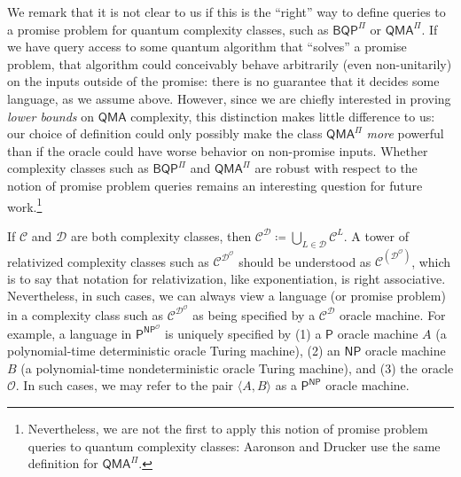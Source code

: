 \documentclass[10pt,a4paper]{article}
\begin{document}
We remark that it is not clear to us if this is the ``right'' way to define queries to a promise problem for quantum complexity classes, such as $\mathsf{BQP}^\Pi$ or $\mathsf{QMA}^\Pi$. If we have query access to some quantum algorithm that ``solves'' a promise problem, that algorithm could conceivably behave arbitrarily (even non-unitarily) on the inputs outside of the promise: there is no guarantee that it decides some language, as we assume above. However, since we are chiefly interested in proving \textit{lower bounds} on $\mathsf{QMA}$ complexity, this distinction makes little difference to us: our choice of definition could only possibly make the class $\mathsf{QMA}^\Pi$ \textit{more} powerful than if the oracle could have worse behavior on non-promise inputs. Whether complexity classes such as $\mathsf{BQP}^\Pi$ and $\mathsf{QMA}^\Pi$ are robust with respect to the notion of promise problem queries remains an interesting question for future work.\footnote{Nevertheless, we are not the first to apply this notion of promise problem queries to quantum complexity classes: Aaronson and Drucker \cite{AD14} use the same definition for $\mathsf{QMA}^\Pi$.}

If $\mathcal{C}$ and $\mathcal{D}$ are both complexity classes, then $\mathcal{C}^\mathcal{D} \coloneqq \bigcup_{L \in \mathcal{D}} \mathcal{C}^L$. A tower of relativized complexity classes such as $\mathcal{C}^{\mathcal{D}^\mathcal{O}}$ should be understood as $\mathcal{C}^{\left(\mathcal{D}^\mathcal{O}\right)}$, which is to say that notation for relativization, like exponentiation, is right associative. Nevertheless, in such cases, we can always view a language (or promise problem) in a complexity class such as $\mathcal{C}^{\mathcal{D}^\mathcal{O}}$ as being specified by a $\mathcal{C}^\mathcal{D}$ oracle machine. For example, a language in $\mathsf{P}^{\mathsf{NP}^\mathcal{O}}$ is uniquely specified by (1) a $\mathsf{P}$ oracle machine $A$ (a polynomial-time deterministic oracle Turing machine), (2) an $\mathsf{NP}$ oracle machine $B$ (a polynomial-time nondeterministic oracle Turing machine), and (3) the oracle $\mathcal{O}$. In such cases, we may refer to the pair $\langle A, B \rangle$ as a $\mathsf{P}^\mathsf{NP}$ oracle machine.
\end{document}
